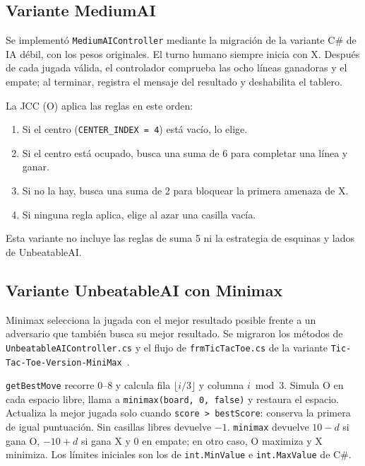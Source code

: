 \documentclass[12pt,a4paper]{article}
\begin{document}
\subsection{Variante MediumAI}
Se implementó \texttt{MediumAIController} mediante la migración de la variante
C\# de IA débil, con los pesos originales. El turno humano siempre inicia con X.
Después de cada jugada válida, el controlador comprueba las ocho líneas ganadoras
y el empate; al terminar, registra el mensaje del resultado y deshabilita el tablero.

La JCC (O) aplica las reglas en este orden:
\begin{enumerate}
  \item Si el centro (\texttt{CENTER\_INDEX = 4}) está vacío, lo elige.
  \item Si el centro está ocupado, busca una suma de 6 para completar una línea y ganar.
  \item Si no la hay, busca una suma de 2 para bloquear la primera amenaza de X.
  \item Si ninguna regla aplica, elige al azar una casilla vacía.
\end{enumerate}
Esta variante no incluye las reglas de suma 5 ni la estrategia de esquinas y lados
de UnbeatableAI.

\subsection{Variante UnbeatableAI con Minimax}
Minimax selecciona la jugada con el mejor resultado posible frente a un adversario
que también busca su mejor resultado. Se migraron los métodos de
\texttt{UnbeatableAIController.cs} y el flujo de \texttt{frmTicTacToe.cs} de la
variante \texttt{Tic-Tac-Toe-Version-MiniMax}~\cite{minimax-docente}.

\texttt{getBestMove} recorre 0--8 y calcula fila $\lfloor i/3\rfloor$ y columna
$i\bmod3$. Simula O en cada espacio libre, llama a \texttt{minimax(board, 0, false)}
y restaura el espacio. Actualiza la mejor jugada solo cuando
\texttt{score > bestScore}: conserva la primera de igual puntuación. Sin casillas
libres devuelve $-1$. \texttt{minimax} devuelve $10-d$ si gana O, $-10+d$ si gana
X y 0 en empate; en otro caso, O maximiza y X minimiza. Los límites iniciales son
los de \texttt{int.MinValue} e \texttt{int.MaxValue} de C\#.
\end{document}
